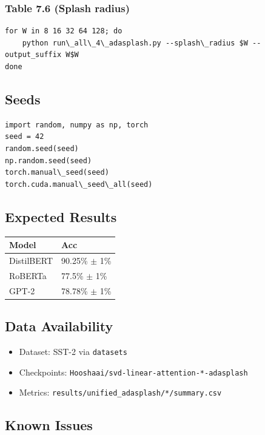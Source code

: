 \subsubsection{Table 7.6 (Splash radius)}
\begin{lstlisting}
for W in 8 16 32 64 128; do
    python run\_all\_4\_adasplash.py --splash\_radius $W --output_suffix W$W
done
\end{lstlisting}

\subsection{Seeds}

\begin{lstlisting}
import random, numpy as np, torch
seed = 42
random.seed(seed)
np.random.seed(seed)
torch.manual\_seed(seed)
torch.cuda.manual\_seed\_all(seed)
\end{lstlisting}

\subsection{Expected Results}

\begin{table}[H]
\centering
\small
\begin{tabular}{ll}
\toprule
\textbf{Model} & \textbf{Acc} \\
\midrule
DistilBERT & 90.25\% $\pm$ 1\% \\
RoBERTa & 77.5\% $\pm$ 1\% \\
GPT-2 & 78.78\% $\pm$ 1\% \\
\bottomrule
\end{tabular}
\end{table}

\subsection{Data Availability}

\begin{itemize}
\item Dataset: SST-2 via \texttt{datasets}
\item Checkpoints: \texttt{Hooshaai/svd-linear-attention-*-adasplash}
\item Metrics: \texttt{results/unified\_adasplash/*/summary.csv}

\end{itemize}
\subsection{Known Issues}

